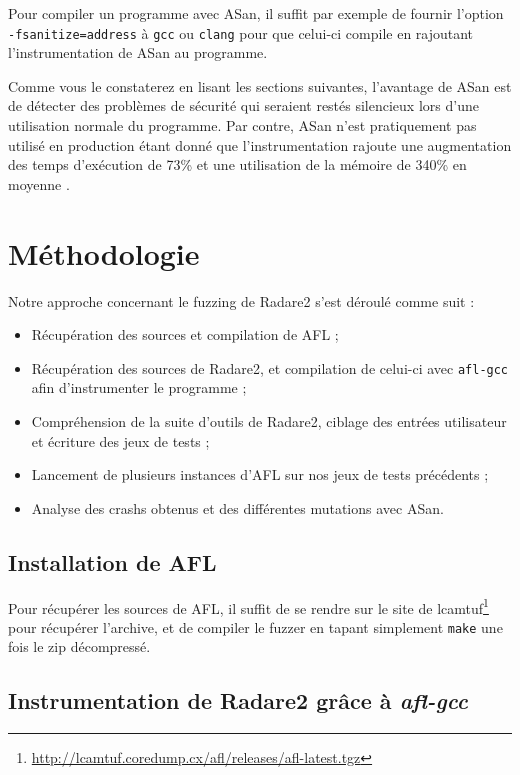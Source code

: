 Pour compiler un programme avec ASan, il suffit par exemple de fournir l'option \lstinline{-fsanitize=address} à \lstinline{gcc} ou \lstinline{clang} pour que celui-ci compile en rajoutant l'instrumentation de ASan au programme.

Comme vous le constaterez en lisant les sections suivantes, l'avantage de ASan est de détecter des problèmes de sécurité qui seraient restés silencieux lors d'une utilisation normale du programme.
Par contre, ASan n'est pratiquement pas utilisé en production étant donné que l'instrumentation rajoute une augmentation des temps d'exécution de 73\% et une utilisation de la mémoire de 340\% en moyenne \cite{asan}.

\section{Méthodologie}

Notre approche concernant le fuzzing de Radare2 s'est déroulé comme suit :

\begin{itemize}
\item Récupération des sources et compilation de AFL ;
\item Récupération des sources de Radare2, et compilation de celui-ci avec \lstinline{afl-gcc} afin d'instrumenter le programme ;
\item Compréhension de la suite d'outils de Radare2, ciblage des entrées utilisateur et écriture des jeux de tests ;
\item Lancement de plusieurs instances d'AFL sur nos jeux de tests précédents ;
\item Analyse des crashs obtenus et des différentes mutations avec ASan.
\end{itemize}

\subsection{Installation de AFL}

Pour récupérer les sources de AFL, il suffit de se rendre sur le site de lcamtuf\footnote{\url{http://lcamtuf.coredump.cx/afl/releases/afl-latest.tgz}} pour récupérer l'archive, et de compiler le fuzzer en tapant simplement \lstinline{make} une fois le zip décompressé.

\subsection{Instrumentation de Radare2 grâce à \emph{afl-gcc}}

